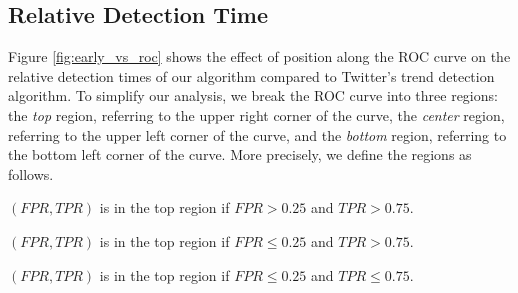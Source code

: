 \clearpage
\subsection{Relative Detection Time}
Figure \ref{fig:early_vs_roc} shows the effect of position along the ROC curve
on the relative detection times of our algorithm compared to Twitter's trend
detection algorithm. To simplify our analysis, we break the ROC curve into three
regions: the {\em top} region, referring to the upper right corner of the curve,
the {\em center} region, referring to the upper left corner of the curve, and
the {\em bottom} region, referring to the bottom left corner of the curve. More
precisely, we define the regions as follows.

\begin{defn}
$(FPR,TPR)$ is in the top region if $FPR > 0.25$ and $TPR > 0.75$.
\end{defn}
\begin{defn}
$(FPR,TPR)$ is in the top region if $FPR \leq 0.25$ and $TPR > 0.75$.
\end{defn}
\begin{defn}
$(FPR,TPR)$ is in the top region if $FPR \leq 0.25$ and $TPR \leq 0.75$.
\end{defn}


